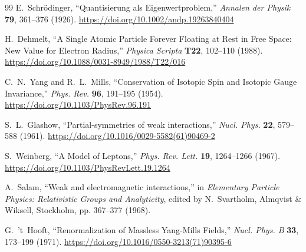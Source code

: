 \documentclass[%
 reprint,
 amsmath,amssymb,
 aps,
]{revtex4-1}
\numberwithin{equation}{section}%
\begin{document}
\begin{thebibliography}{99}
E.~Schrödinger, 
``Quantisierung als Eigenwertproblem,'' 
\textit{Annalen der Physik} \textbf{79}, 361--376 (1926).
\href{https://doi.org/10.1002/andp.19263840404}{https://doi.org/10.1002/andp.19263840404}

H.~Dehmelt, 
``A Single Atomic Particle Forever Floating at Rest in Free Space: New Value for Electron Radius,'' 
\textit{Physica Scripta} \textbf{T22}, 102--110 (1988).
\href{https://doi.org/10.1088/0031-8949/1988/T22/016}{https://doi.org/10.1088/0031-8949/1988/T22/016}

C.~N.~Yang and R.~L.~Mills, 
``Conservation of Isotopic Spin and Isotopic Gauge Invariance,'' 
\textit{Phys. Rev.} \textbf{96}, 191--195 (1954).
\href{https://doi.org/10.1103/PhysRev.96.191}{https://doi.org/10.1103/PhysRev.96.191}

S.~L.~Glashow, 
``Partial-symmetries of weak interactions,'' 
\textit{Nucl. Phys.} \textbf{22}, 579--588 (1961).
\href{https://doi.org/10.1016/0029-5582(61)90469-2}{https://doi.org/10.1016/0029-5582(61)90469-2}

S.~Weinberg, 
``A Model of Leptons,'' 
\textit{Phys. Rev. Lett.} \textbf{19}, 1264--1266 (1967).
\href{https://doi.org/10.1103/PhysRevLett.19.1264}{https://doi.org/10.1103/PhysRevLett.19.1264}

A.~Salam, 
``Weak and electromagnetic interactions,'' 
in \textit{Elementary Particle Physics: Relativistic Groups and Analyticity}, edited by N.~Svartholm, 
Almqvist \& Wiksell, Stockholm, pp. 367--377 (1968).

G.~'t~Hooft, 
``Renormalization of Massless Yang-Mills Fields,'' 
\textit{Nucl. Phys. B} \textbf{33}, 173--199 (1971).
\href{https://doi.org/10.1016/0550-3213(71)90395-6}{https://doi.org/10.1016/0550-3213(71)90395-6}


\end{thebibliography}
\end{document}
